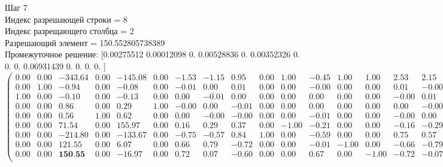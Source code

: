 \documentclass{article}
\begin{document}
\begin{flushleft}
    Шаг 7\\
Индекс разрешающей строки = 8\\
Индекс разрещающего столбца = 2\\
Разрешающий элемент = 150.552805738389\\
Промежуточное решение:
 [0.00275512 0.00012098 0.         0.00528836 0.         0.00352326
 0.         0.         0.         0.06931439 0.         0.
 0.         0.        ]
\begin{equation*}
\begin{pmatrix}
 0.00 & 0.00 & -343.64 & 0.00 & -145.08 & 0.00 & -1.53 & -1.15 &  0.95 & 0.00 &  1.00 & -0.45 &  1.00 &  1.00 &  2.53 &  2.15 &  0.05 &  1.00 & 0.00 &  1.45 & 0.00 & 0.00 & -0.82 \\
 0.00 & 1.00 &   -0.94 & 0.00 &   -0.08 & 0.00 & -0.01 &  0.00 &  0.01 & 0.00 &  0.00 & -0.00 &  0.00 &  0.00 &  0.01 & -0.00 & -0.01 &  0.00 & 0.00 &  0.00 & 0.00 & 0.00 &  0.00 \\
 1.00 & 0.00 &   -0.10 & 0.00 &   -0.13 & 0.00 &  0.00 & -0.01 &  0.00 & 0.00 &  0.00 &  0.00 &  0.00 &  0.00 & -0.00 &  0.01 & -0.00 &  0.00 & 0.00 & -0.00 & 0.00 & 0.00 &  0.00 \\
 0.00 & 0.00 &    0.86 & 0.00 &    0.29 & 1.00 & -0.00 &  0.00 & -0.01 & 0.00 &  0.00 &  0.00 &  0.00 &  0.00 &  0.00 & -0.00 &  0.01 &  0.00 & 0.00 & -0.00 & 0.00 & 0.00 &  0.00 \\
 0.00 & 0.00 &    0.56 & 1.00 &    0.62 & 0.00 &  0.00 & -0.00 & -0.00 & 0.00 &  0.00 & -0.01 &  0.00 &  0.00 & -0.00 &  0.00 &  0.00 &  0.00 & 0.00 &  0.01 & 0.00 & 0.00 &  0.01 \\
 0.00 & 0.00 &   71.54 & 0.00 &  155.97 & 0.00 &  0.16 &  0.29 &  0.37 & 0.00 & -1.00 & -0.21 &  0.00 &  0.00 & -0.16 & -0.29 & -0.37 &  0.00 & 1.00 &  0.21 & 0.00 & 0.00 &  0.39 \\
 0.00 & 0.00 & -214.80 & 0.00 & -133.67 & 0.00 & -0.75 & -0.57 &  0.84 & 1.00 &  0.00 & -0.59 &  0.00 &  0.00 &  0.75 &  0.57 & -0.84 & -1.00 & 0.00 &  0.59 & 0.00 & 0.00 &  0.07 \\
 0.00 & 0.00 &  121.55 & 0.00 &    6.07 & 0.00 &  0.66 &  0.79 & -0.72 & 0.00 &  0.00 & -0.01 & -1.00 &  0.00 & -0.66 & -0.79 &  0.72 &  0.00 & 0.00 &  0.01 & 1.00 & 0.00 &  0.28 \\
 0.00 & 0.00 &  \textbf{150.55} & 0.00 &  -16.97 & 0.00 &  0.72 &  0.07 & -0.60 & 0.00 &  0.00 &  0.67 &  0.00 & -1.00 & -0.72 & -0.07 &  0.60 &  0.00 & 0.00 & -0.67 & 0.00 & 1.00 &  0.14 \\
\end{pmatrix}
\end{equation*}
\end{flushleft}
\end{document}
